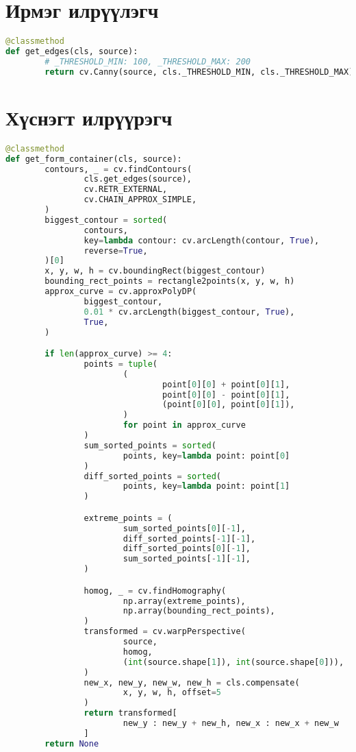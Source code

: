 \appendix
{}

\chapter{Ирмэг илрүүлэгч}
\label{appendix:get_edges}

\begin{lstlisting}[language=Python]
@classmethod
def get_edges(cls, source):
		# _THRESHOLD_MIN: 100, _THRESHOLD_MAX: 200
		return cv.Canny(source, cls._THRESHOLD_MIN, cls._THRESHOLD_MAX) 
\end{lstlisting}

\chapter{Хүснэгт илрүүрэгч}
\label{appendix:get_container}

\begin{lstlisting}[language=Python]
@classmethod
def get_form_container(cls, source):
		contours, _ = cv.findContours(
				cls.get_edges(source),
				cv.RETR_EXTERNAL,
				cv.CHAIN_APPROX_SIMPLE,
		)
		biggest_contour = sorted(
				contours,
				key=lambda contour: cv.arcLength(contour, True),
				reverse=True,
		)[0]
		x, y, w, h = cv.boundingRect(biggest_contour)
		bounding_rect_points = rectangle2points(x, y, w, h)
		approx_curve = cv.approxPolyDP(
				biggest_contour,
				0.01 * cv.arcLength(biggest_contour, True),
				True,
		)

		if len(approx_curve) >= 4:
				points = tuple(
						(
								point[0][0] + point[0][1],
								point[0][0] - point[0][1],
								(point[0][0], point[0][1]),
						)
						for point in approx_curve
				)
				sum_sorted_points = sorted(
						points, key=lambda point: point[0]
				)
				diff_sorted_points = sorted(
						points, key=lambda point: point[1]
				)

				extreme_points = (
						sum_sorted_points[0][-1],
						diff_sorted_points[-1][-1],
						diff_sorted_points[0][-1],
						sum_sorted_points[-1][-1],
				)

				homog, _ = cv.findHomography(
						np.array(extreme_points),
						np.array(bounding_rect_points),
				)
				transformed = cv.warpPerspective(
						source,
						homog,
						(int(source.shape[1]), int(source.shape[0])),
				)
				new_x, new_y, new_w, new_h = cls.compensate(
						x, y, w, h, offset=5
				)
				return transformed[
						new_y : new_y + new_h, new_x : new_x + new_w
				]
		return None
\end{lstlisting}

